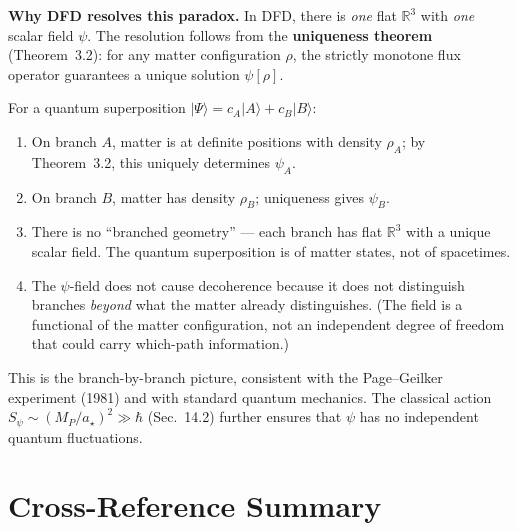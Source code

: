 \documentclass[11pt,a4paper]{article}
\begin{document}
\begin{tcolorbox}[colback=green!5!white, colframe=green!60!black,
  title=Proposed Replacement Text]
\textbf{Why DFD resolves this paradox.}
In DFD, there is \textit{one} flat $\mathbb{R}^3$ with \textit{one}
scalar field $\psi$. The resolution follows from the
\textbf{uniqueness theorem} (Theorem~3.2): for any matter
configuration $\rho$, the strictly monotone flux operator guarantees
a unique solution $\psi[\rho]$.

For a quantum superposition
$|\Psi\rangle = c_A|A\rangle + c_B|B\rangle$:
\begin{enumerate}
\item On branch $A$, matter is at definite positions with density
$\rho_A$; by Theorem~3.2, this uniquely determines $\psi_A$.
\item On branch $B$, matter has density $\rho_B$; uniqueness gives
$\psi_B$.
\item There is no ``branched geometry'' --- each branch has flat
$\mathbb{R}^3$ with a unique scalar field. The quantum superposition
is of matter states, not of spacetimes.
\item The $\psi$-field does not cause decoherence because it does not
distinguish branches \emph{beyond} what the matter already
distinguishes. (The field is a functional of the matter
configuration, not an independent degree of freedom that could
carry which-path information.)
\end{enumerate}
This is the branch-by-branch picture, consistent with the
Page--Geilker experiment (1981) and with standard quantum mechanics.
The classical action $S_\psi \sim (M_P/a_\star)^2 \gg \hbar$
(Sec.~14.2) further ensures that $\psi$ has no independent quantum
fluctuations.
\end{tcolorbox}

\section{Cross-Reference Summary}
\end{document}
